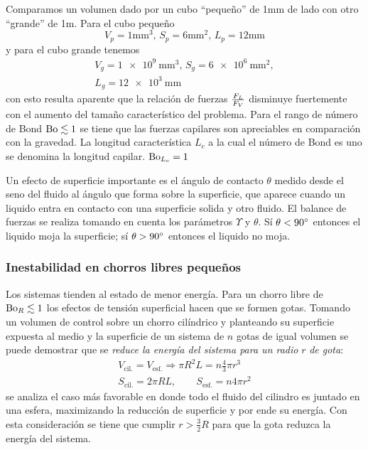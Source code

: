 Comparamos un volumen dado por un cubo ``pequeño'' de 1mm de lado con otro ``grande'' de 1m. Para el cubo pequeño
\vspace{-.2cm}
\[V_p=1\si{\milli \meter \cubed},\, S_p=6 \si{\milli \meter \squared},\, L_p = 12 \si{\milli \meter} \]
y para el cubo grande tenemos
\vspace{-.2cm}
\begin{gather*}
    V_g=\SI{1e9}{\milli \meter \cubed},\, S_g=\SI{6e6}{\milli \meter \squared},\\ L_g =\SI{12e3}{\milli \meter}
\end{gather*}
con esto resulta aparente que la relación de fuerzas $\frac{F_{\mbox{\tiny $L$}}}{F_{\mbox{\tiny $V$}}}$ disminuye fuertemente con el aumento del tamaño característico del problema. Para el rango de número de Bond $\textrm{Bo} \lesssim 1$ se tiene que las fuerzas capilares son apreciables en comparación con la gravedad. La longitud característica $L_c$ a la cual el número de Bond es uno se denomina la longitud capilar. $\textrm{Bo}_{L_c}=1$

Un efecto de superficie importante es el ángulo de contacto $\theta$ medido desde el seno del fluido al ángulo que forma sobre la superficie, que aparece cuando un liquido entra en contacto con una superficie solida y otro fluido. El balance de fuerzas se realiza tomando en cuenta los parámetros $\Upsilon$ y $\theta$. Sí $\theta<90^{\circ}$ entonces el liquido moja la superficie; sí $\theta>90^{\circ}$ entonces el liquido no moja.%

\subsubsection{Inestabilidad en chorros libres pequeños}
Los sistemas tienden al estado de menor energía. Para un chorro libre de $\textrm{Bo}_R \lesssim 1$ los efectos de tensión superficial hacen que se formen gotas. Tomando un volumen de control sobre un chorro cilíndrico y planteando su superficie expuesta al medio y la superficie de un sistema de $n$ gotas de igual volumen se puede demostrar que se \textit{reduce la energía del sistema para un radio} $r$ \textit{de gota}:
\begin{gather*}
	V_{\mathrm{cil.}}=V_{\mathrm{esf.}} \Rightarrow	\pi R^2 L =n \frac{4}{3}\pi r^3 \\
	S_{\mathrm{cil.}}=2\pi RL, \qquad S_{\mathrm{esf.}}=n4\pi r^2
\end{gather*}
se analiza el caso más favorable en donde todo el fluido del cilindro es juntado en una esfera, maximizando la reducción de superficie y por ende su energía. Con esta consideración se tiene que cumplir $r>\frac{3}{2}R$ para que la gota reduzca la energía del sistema. 


